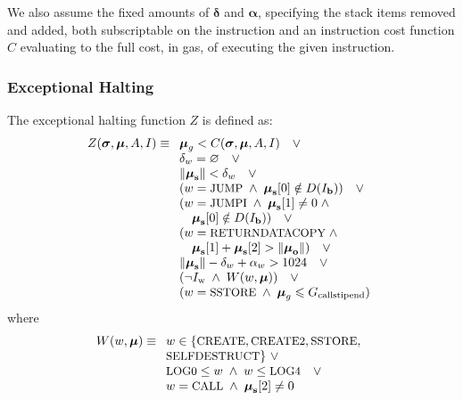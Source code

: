 \documentclass[9pt,oneside]{amsart}
\makeatletter
\newcommand{\linkdest}[1]{\Hy@raisedlink{\hypertarget{#1}{}}}
\makeatother
\begin{document}
\begin{multicols}{2}
We also assume the fixed amounts of $\mathbf{\delta}$ and $\mathbf{\alpha}$, specifying the stack items removed and added, both subscriptable on the instruction and an instruction cost function $C$ evaluating to the full cost, in gas, of executing the given instruction.

\subsubsection{Exceptional Halting}\hypertarget{Exceptional_Halting_function_Z}{}\linkdest{zhalt}

The exceptional halting function $Z$ is defined as:
\begin{equation}
Z(\boldsymbol{\sigma}, \boldsymbol{\mu}, A, I) \equiv
\begin{array}[t]{l}
\boldsymbol{\mu}_g < C(\boldsymbol{\sigma}, \boldsymbol{\mu}, A, I) \quad \vee \\
\mathbf{\delta}_w = \varnothing \quad \vee \\
\lVert\boldsymbol{\mu}_\mathbf{s}\rVert < \mathbf{\delta}_w \quad \vee \\
( w = \text{\small JUMP} \; \wedge \; \boldsymbol{\mu}_\mathbf{s}[0] \notin D(I_\mathbf{b}) ) \quad \vee \\
( w = \text{\small JUMPI} \; \wedge \; \boldsymbol{\mu}_\mathbf{s}[1] \neq 0 \; \wedge \\
\quad \boldsymbol{\mu}_\mathbf{s}[0] \notin D(I_\mathbf{b}) ) \quad \vee \\
( w = \text{\small RETURNDATACOPY} \; \wedge \\ \quad \boldsymbol{\mu}_{\mathbf{s}}[1] + \boldsymbol{\mu}_{\mathbf{s}}[2] > \lVert\boldsymbol{\mu}_{\mathbf{o}}\rVert) \quad \vee \\
\lVert\boldsymbol{\mu}_\mathbf{s}\rVert - \mathbf{\delta}_w + \mathbf{\alpha}_w > 1024 \quad \vee \\
( \neg I_{\mathrm{w}} \; \wedge \; W(w, \boldsymbol{\mu}) ) \quad \vee \\
( w = \text{\small SSTORE} \; \wedge \; \boldsymbol{\mu}_g \leqslant G_{\mathrm{callstipend}} )
\end{array}
\end{equation}
where
\begin{equation}
W(w, \boldsymbol{\mu}) \equiv \\
\begin{array}[t]{l}
w \in \{\text{\small CREATE}, \text{\small CREATE2}, \text{\small SSTORE},\\ \text{\small SELFDESTRUCT}\} \ \vee \\
\text{\small LOG0} \le w \; \wedge \; w \le \text{\small LOG4} \quad \vee \\
w = \text{\small CALL} \; \wedge \; \boldsymbol{\mu}_{\mathbf{s}}[2] \neq 0
\end{array}
\end{equation}


\end{multicols}
\end{document}
